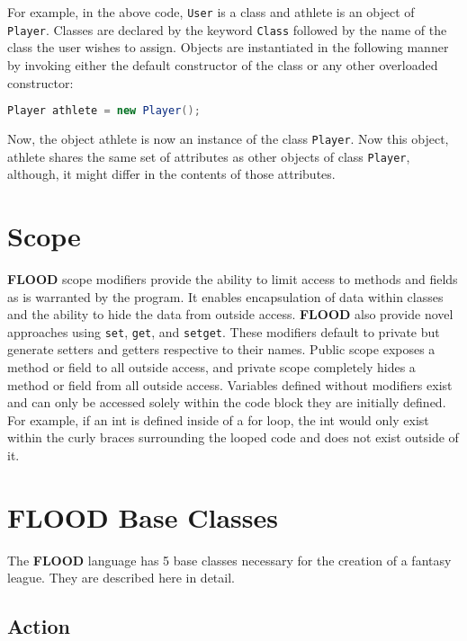\documentclass[12pt]{report}
\begin{document}
For example, in the above code, \texttt{User} is a class and athlete is an object of \texttt{Player}.  Classes are declared by the keyword \texttt{Class} followed by the name of the class the user wishes to assign. Objects are instantiated in the following manner by invoking either the default constructor of the class or any other overloaded constructor:

\begin{singlespace}
\begin{lstlisting}[language=Java,label=some-code,caption=Object instantiantion]
Player athlete = new Player();
\end{lstlisting}
\end{singlespace}

Now, the object athlete is now an instance of the class \texttt{Player}.  Now this object, athlete shares the same set of attributes as other objects of class \texttt{Player}, although, it might differ in the contents of those attributes.

\section{Scope}

\textbf{FLOOD} scope modifiers provide the ability to limit access to methods and fields as is warranted by the program. It enables encapsulation of data within classes and the ability to hide the data from outside access. \textbf{FLOOD} also provide novel approaches using \texttt{set}, \texttt{get}, and \texttt{setget}. These modifiers default to private but generate setters and getters respective to their names.  Public scope exposes a method or field to all outside access, and private scope completely hides a method or field from all outside access. Variables defined without modifiers exist and can only be accessed solely within the code block they are initially defined. For example, if an int is defined inside of a for loop, the int would only exist within the curly braces surrounding the looped code and does not exist outside of it.

\section{FLOOD Base Classes}

The \textbf{FLOOD} language has 5 base classes necessary for the creation of a fantasy league. They are described here in detail.

\subsection{Action}
\end{document}
